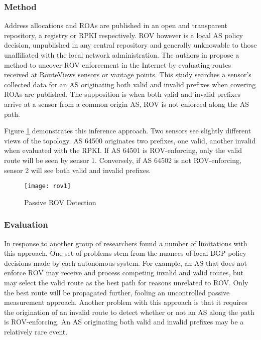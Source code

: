 \documentclass[sigconf]{acmart}
\begin{document}
\subsubsection{Method}

Address allocations and ROAs are published in an open and transparent
repository, a registry or RPKI respectively.  ROV however is a local AS
policy decision, unpublished in any central repository and generally
unknowable to those unaffiliated with the local network administration.
The authors in \cite{gilad_are_2017} propose a method to uncover ROV
enforcement in the Internet by evaluating routes received at RouteViews
sensors or vantage points.  This study searches a sensor's collected
data for an AS originating both valid and invalid prefixes when covering
ROAs are published.  The supposition is when both valid and invalid
prefixes arrive at a sensor from a common origin AS, ROV is not enforced
along the AS path.

Figure \ref{fig:rov1} demonstrates this inference approach.  Two sensors
see slightly different views of the topology.  AS 64500 originates two
prefixes, one valid, another invalid when evaluated with the RPKI.  If
AS 64501 is ROV-enforcing, only the valid route will be seen by sensor
1.  Conversely, if AS 64502 is not ROV-enforcing, sensor 2 will see both
valid and invalid prefixes.

\begin{figure}
  \centering
    \texttt{[image: rov1]}
  \caption{Passive ROV Detection}
  \label{fig:rov1}
\end{figure}

\subsubsection{Evaluation}

In response to \cite{gilad_are_2017} another group of researchers found
a number of limitations with this approach.\cite{reuter_towards_2018}
One set of problems stem from the nuances of local BGP policy decisions
made by each autonomous system.  For example, an AS that does not
enforce ROV may receive and process competing invalid and valid routes,
but may select the valid route as the best path for reasons unrelated to
ROV.  Only the best route will be propagated further, fooling an
uncontrolled passive measurement approach.  Another problem with this
approach is that it requires the origination of an invalid route to
detect whether or not an AS along the path is ROV-enforcing.  An AS
originating both valid and invalid prefixes may be a relatively rare
event.
\end{document}
